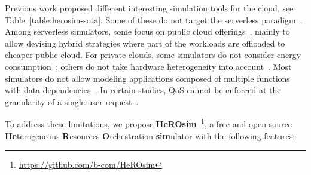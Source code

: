 Previous work proposed different interesting simulation tools for the cloud, see Table~\ref{table:herosim-sota}. Some of these do not target the serverless paradigm~\cite{calheiros_cloudsim_2011, wickremasinghe_cloudanalyst_2010, cai_elasticsim_2017, buyyaGridSimToolkitModeling2002, nunez_icancloud_2012, mahmudIFogSim2ExtendedIFogSim2021}. Among serverless simulators, some focus on public cloud offerings~\cite{nunez_icancloud_2012, mahmoudiSimFaaSPerformanceSimulator2021}, mainly to allow devising hybrid strategies where part of the workloads are offloaded to cheaper public cloud. For private clouds, some simulators do not consider energy consumption~\cite{jeonCloudSimExtensionSimulatingDistributed2019, cai_elasticsim_2017, buyyaGridSimToolkitModeling2002, nunez_icancloud_2012}; others do not take hardware heterogeneity into account~\cite{jeonCloudSimExtensionSimulatingDistributed2019, nunez_icancloud_2012, mahmoudiSimFaaSPerformanceSimulator2021}. Most simulators do not allow modeling applications composed of multiple functions with data dependencies~\cite{calheiros_cloudsim_2011, mampage_cloudsimsc_2023, wickremasinghe_cloudanalyst_2010, jeonCloudSimExtensionSimulatingDistributed2019, buyyaGridSimToolkitModeling2002, nunez_icancloud_2012, mahmudIFogSim2ExtendedIFogSim2021}. In certain studies, QoS cannot be enforced at the granularity of a single-user request~\cite{calheiros_cloudsim_2011, mampage_cloudsimsc_2023, wickremasinghe_cloudanalyst_2010, cai_elasticsim_2017, nunez_icancloud_2012, mahmudIFogSim2ExtendedIFogSim2021, mastenbroekOpenDCConvenientModeling2021, mahmoudiSimFaaSPerformanceSimulator2021}. %

To address these limitations, we propose \textbf{HeROsim}~\footnote{\href{https://github.com/b-com/HeROsim}{https://github.com/b-com/HeROsim}}, a free and open source \textbf{He}terogeneous \textbf{R}esources \textbf{O}rchestration \textbf{sim}ulator with the following features:

